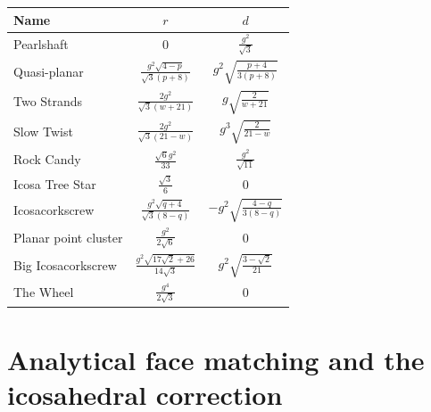 \documentclass[11pt]{article}
\theoremstyle{definition}
\begin{document}
\begin{center}
\small
\renewcommand{\arraystretch}{1.6}
\begin{tabular}{@{}lcc@{}}
\toprule
Name & $r$ & $d$\\
\midrule
Pearlshaft & $\displaystyle 0$ & $\displaystyle \frac{g^{2}}{\sqrt{3}}$\\
Quasi-planar & $\displaystyle \frac{g^{2} \sqrt{4 - p}}{\sqrt{3} \left(p + 8\right)}$ & $\displaystyle g^{2} \sqrt{\frac{p + 4}{3 \left(p + 8\right)}}$\\
Two Strands & $\displaystyle \frac{2 g^{2}}{\sqrt{3} \left(w + 21\right)}$ & $\displaystyle g \sqrt{\frac{2}{w + 21}}$\\
Slow Twist & $\displaystyle \frac{2 g^{2}}{\sqrt{3} \left(21 - w\right)}$ & $\displaystyle g^{3} \sqrt{\frac{2}{21 - w}}$\\
Rock Candy & $\displaystyle \frac{\sqrt{6} g^{2}}{33}$ & $\displaystyle \frac{g^{2}}{\sqrt{11}}$\\
Icosa Tree Star & $\displaystyle \frac{\sqrt{3}}{6}$ & $\displaystyle 0$\\
Icosacorkscrew & $\displaystyle \frac{g^{2} \sqrt{q + 4}}{\sqrt{3} \left(8 - q\right)}$ & $\displaystyle - g^{2} \sqrt{\frac{4 - q}{3 \left(8 - q\right)}}$\\
Planar point cluster & $\displaystyle \frac{g^{2}}{2 \sqrt{6}}$ & $\displaystyle 0$\\
Big Icosacorkscrew & $\displaystyle \frac{g^{2} \sqrt{17 \sqrt{2} + 26}}{14 \sqrt{3}}$ & $\displaystyle g^{2} \sqrt{\frac{3 - \sqrt{2}}{21}}$\\
The Wheel & $\displaystyle \frac{g^{4}}{2 \sqrt{3}}$ & $\displaystyle 0$\\
\bottomrule
\end{tabular}
\end{center}

\section{Analytical face matching and the icosahedral correction}\label{sec:matching}
\end{document}
